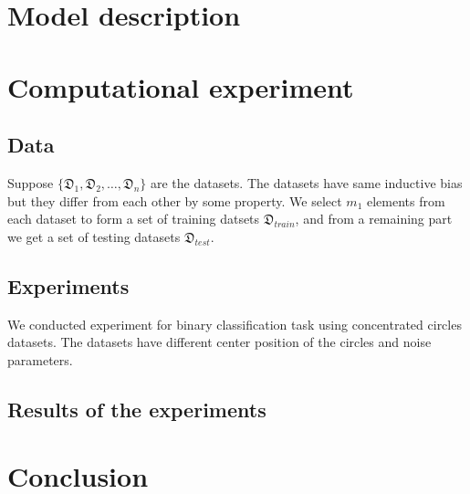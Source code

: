\documentclass{article}
\begin{document}

\section{Model description} 

\section{Computational experiment}
    \subsection{Data}
    Suppose \(\{ \mathfrak{D}_1, \mathfrak{D}_2, \dots, \mathfrak{D}_n\} \) are the datasets.
    The datasets have same inductive bias but they differ from each other by some property.  We select \(m_1\) elements from each dataset to form a set of training datsets \(\mathfrak{D}_{train}\), and from a remaining part we get a set of testing datasets \(\mathfrak{D}_{test}\).
  
    \subsection{Experiments}
    We conducted experiment for binary classification task using concentrated circles datasets. The datasets have different center position of the circles and noise parameters.  

    \subsection{Results of the experiments}

\section{Conclusion}



\end{document}
